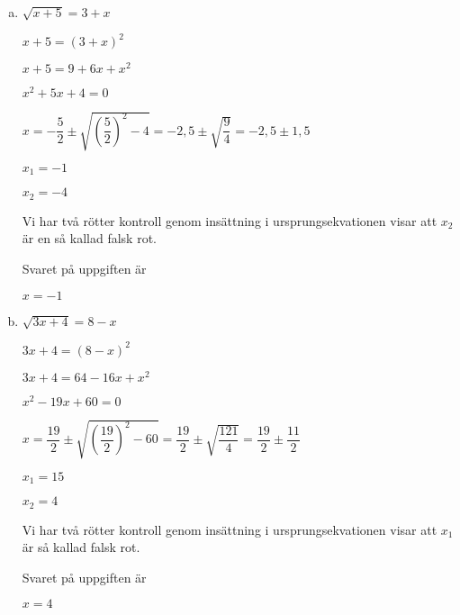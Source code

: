 \documentclass{article}
\begin{document}
\begin{enumerate}[(a)]
\item
$\sqrt{x+5}=3+x$

$x+5=(3+x)^2$

$x+5=9+6x+x^2$

$x^2+5x+4=0$

$x=-\dfrac{5}{2}\pm\sqrt{\left(\dfrac{5}{2}\right)^2-4}=-2,5\pm\sqrt{\dfrac{9}{4}}=-2,5\pm1,5$

$x_1 = -1$

$x_2 = -4$

Vi har två rötter kontroll genom insättning i ursprungsekvationen visar att $x_2$ är en så kallad falsk rot.

Svaret på uppgiften är 

$x = -1$

\item
$\sqrt{3x+4}=8-x$

$3x+4=(8-x)^2$

$3x+4=64-16x+x^2$

$x^2-19x+60=0$

$x=\dfrac{19}{2}\pm\sqrt{\left(\dfrac{19}{2}\right)^2-60}=\dfrac{19}{2}\pm\sqrt{\dfrac{121}{4}}=\dfrac{19}{2}\pm\dfrac{11}{2}$

$x_1 = 15$

$x_2 = 4$

Vi har två rötter kontroll genom insättning i ursprungsekvationen visar att $x_1$ är så kallad falsk rot.

Svaret på uppgiften är 

$x = 4$
\end{enumerate}
\end{document}
